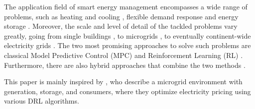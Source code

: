 The application field of smart energy management encompasses a wide range of problems, such as heating and cooling \cite{Blum.2021}\cite{ThomasSchreiber.2020}, flexible demand response \cite{Jin.2021} and energy storage \cite{Nakabi.2021}. Moreover, the scale and level of detail of the tackled problems vary greatly, going from single buildings \cite{Blum.2021}, to microgrids \cite{Nakabi.2021} \cite{Castellanos.04.12.2022}, to eventually continent-wide electricity grids \cite{Horsch.2018}. The two most promising approaches to solve such problems are classical Model Predictive Control (MPC) \cite{Basantes.2023} and Reinforcement Learning (RL) \cite{Nakabi.2021} \cite{Jin.2021} \cite{ThomasSchreiber.2020}\cite{Zhu.2022}. Furthermore, there are also hybrid approaches that combine the two methods \cite{JavierArroyo.2022}.
\par
This paper is mainly inspired by \cite{Nakabi.2021}, who describe a microgrid environment with generation, storage, and consumers, where they optimize electricity pricing using various DRL algorithms.